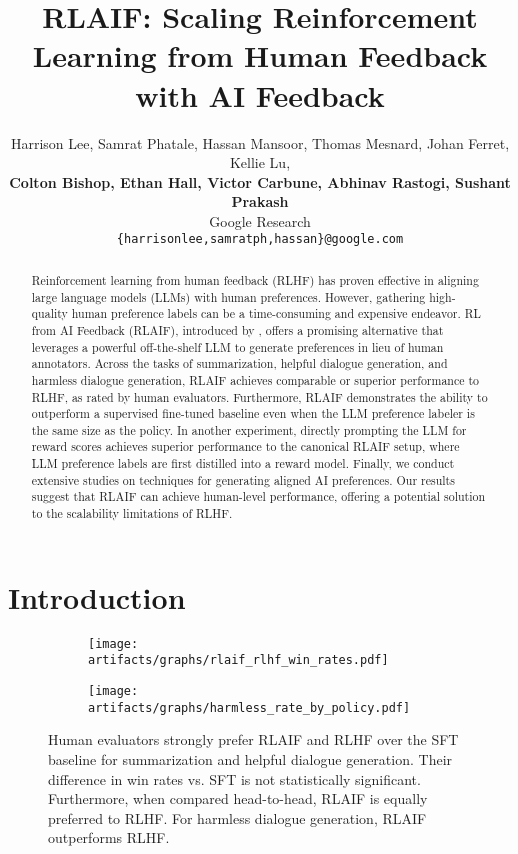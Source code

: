 \documentclass[11pt]{article}
\title{RLAIF: Scaling Reinforcement Learning from Human Feedback\\with AI Feedback}
\author{Harrison Lee, Samrat Phatale, Hassan Mansoor, Thomas Mesnard, Johan Ferret, Kellie Lu,\\
\textbf{Colton Bishop, Ethan Hall, Victor Carbune, Abhinav Rastogi, Sushant Prakash}\\
Google Research\\
\texttt{\{harrisonlee,samratph,hassan\}@google.com}
}
\begin{document}
\maketitle

\begin{abstract}
Reinforcement learning from human feedback (RLHF) has proven effective in aligning large language models (LLMs) with human preferences. However, gathering high-quality human preference labels can be a time-consuming and expensive endeavor. RL from AI Feedback (RLAIF), introduced by \citeauthor{bai2022constitutional}, offers a promising alternative that leverages a powerful off-the-shelf LLM to generate preferences in lieu of human annotators. Across the tasks of summarization, helpful dialogue generation, and harmless dialogue generation, RLAIF achieves comparable or superior performance to RLHF, as rated by human evaluators. Furthermore, RLAIF demonstrates the ability to outperform a supervised fine-tuned baseline even when the LLM preference labeler is the same size as the policy. In another experiment, directly prompting the LLM for reward scores achieves superior performance to the canonical RLAIF setup, where LLM preference labels are first distilled into a reward model. Finally, we conduct extensive studies on techniques for generating aligned AI preferences. Our results suggest that RLAIF can achieve human-level performance, offering a potential solution to the scalability limitations of RLHF.
\end{abstract}

\section{Introduction}

\begin{figure}[ht]
    \centering
    
    \begin{subfigure}{0.43\textwidth}
        \centering
        \texttt{[image: artifacts/graphs/rlaif\_rlhf\_win\_rates.pdf]}
    \end{subfigure}
    \begin{subfigure}{0.43\textwidth}
        \centering
        \texttt{[image: artifacts/graphs/harmless\_rate\_by\_policy.pdf]}
    \end{subfigure}
    
    \vspace{-5pt} %

    \caption{Human evaluators strongly prefer RLAIF and RLHF over the SFT baseline for summarization and helpful dialogue generation. Their difference in win rates vs. SFT is not statistically significant. Furthermore, when compared head-to-head, RLAIF is equally preferred to RLHF. For harmless dialogue generation, RLAIF outperforms RLHF.}
    \label{fig:main_result}
\end{figure}
\end{document}

